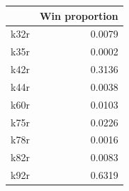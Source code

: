 \begin{tabular}{lr}
\toprule
 & Win proportion \\
\midrule
k32r & 0.0079 \\
k35r & 0.0002 \\
k42r & 0.3136 \\
k44r & 0.0038 \\
k60r & 0.0103 \\
k75r & 0.0226 \\
k78r & 0.0016 \\
k82r & 0.0083 \\
k92r & 0.6319 \\
\bottomrule
\end{tabular}
